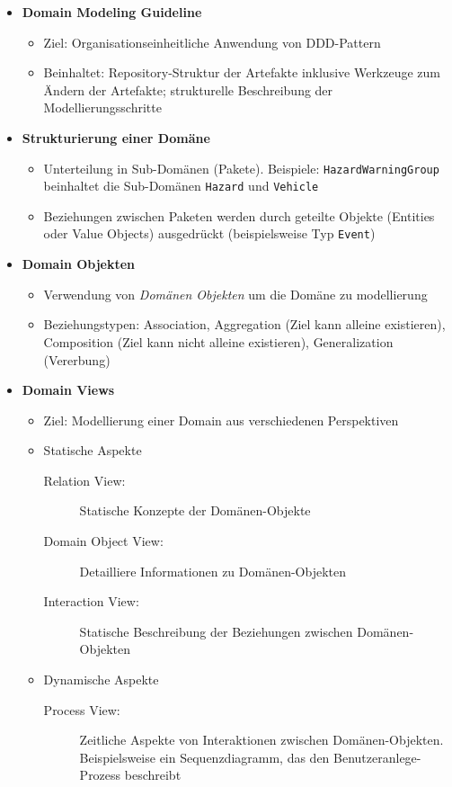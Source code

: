 \begin{itemize}
	\item \textbf{Domain Modeling Guideline}
	\begin{itemize}
		\item Ziel: Organisationseinheitliche Anwendung von DDD-Pattern
		\item Beinhaltet: Repository-Struktur der Artefakte inklusive Werkzeuge zum Ändern der Artefakte; strukturelle Beschreibung der Modellierungsschritte
	\end{itemize}
	\item \textbf{Strukturierung einer Domäne}
	\begin{itemize}
		\item Unterteilung in Sub-Domänen (Pakete). Beispiele: \texttt{HazardWarningGroup} beinhaltet die Sub-Domänen \texttt{Hazard} und \texttt{Vehicle}
		\item Beziehungen zwischen Paketen werden durch geteilte Objekte (Entities oder Value Objects) ausgedrückt (beispielsweise Typ \texttt{Event})
	\end{itemize}
	\item \textbf{Domain Objekten}
	\begin{itemize}
		\item Verwendung von \textit{Domänen Objekten} um die Domäne zu modellierung
		\item Beziehungstypen: Association, Aggregation (Ziel kann alleine existieren), Composition (Ziel kann nicht alleine existieren), Generalization (Vererbung)
	\end{itemize}
	\item \textbf{Domain Views}
	\begin{itemize}
		\item Ziel: Modellierung einer Domain aus verschiedenen Perspektiven
		\item Statische Aspekte
		\begin{description}
			\item[Relation View:] Statische Konzepte der Domänen-Objekte
			\item[Domain Object View:] Detailliere Informationen zu Domänen-Objekten
			\item[Interaction View:] Statische Beschreibung der Beziehungen zwischen Domänen-Objekten
		\end{description}
		\item Dynamische Aspekte
		\begin{description}
			\item[Process View:] Zeitliche Aspekte von Interaktionen zwischen Domänen-Objekten. Beispielsweise ein Sequenzdiagramm, das den Benutzeranlege-Prozess beschreibt
		\end{description}
	\end{itemize}
\end{itemize}



